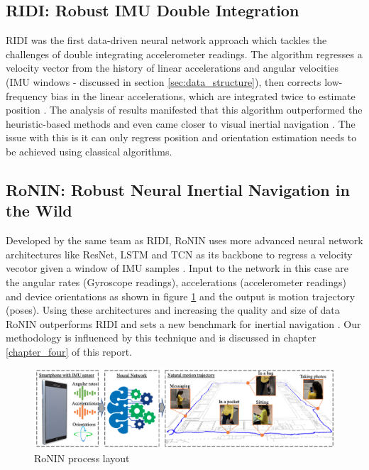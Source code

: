 \subsection{RIDI: Robust IMU Double Integration}
RIDI was the first data-driven neural network approach which tackles the challenges of double integrating accelerometer readings. The algorithm regresses a velocity vector from the history of linear accelerations and angular velocities (IMU windows - discussed in section \ref{sec:data_structure}), then corrects low-frequency bias in the linear accelerations, which are integrated twice to estimate position \citep{yan2018ridi}. The analysis of results manifested that this algorithm outperformed the heuristic-based methods and even came closer to visual inertial navigation \citep{yan2018ridi}. The issue with this is it can only regress position and orientation estimation needs to be achieved using classical algorithms.

\subsection{RoNIN: Robust Neural Inertial Navigation in the Wild}
Developed by the same team as RIDI, RoNIN uses more advanced neural network architectures like ResNet, LSTM and TCN as its backbone to regress a velocity vecotor given a window of IMU samples \citep{herath2020ronin}. Input to the network in this case are the angular rates (Gyroscope readings), accelerations (accelerometer readings) and device orientations as shown in figure \ref{fig:ronin} and the output is motion trajectory (poses). Using these architectures and increasing the quality and size of data RoNIN outperforms RIDI and sets a new benchmark for inertial navigation \citep{herath2020ronin}. Our methodology is influenced by this technique and is discussed in chapter \ref{chapter_four} of this report.

\begin{figure}[H]
    \centering
    \includegraphics[scale=0.21]{images/fig_chapter3/ronin.png}
    \caption{RoNIN process layout \citep{herath2020ronin}}
    \label{fig:ronin}
\end{figure}

